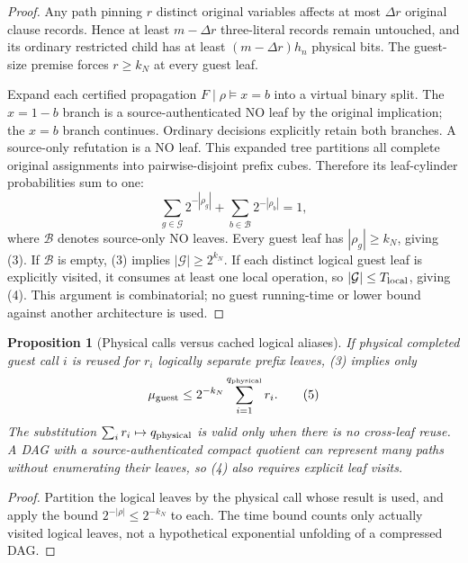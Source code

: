 \documentclass[11pt]{article}
\newtheorem{proposition}{Proposition}
\begin{document}
\begin{proof}
Any path pinning $r$ distinct original variables affects at most
$\Delta r$ original clause records. Hence at least $m-\Delta r$
three-literal records remain untouched, and its ordinary restricted child
has at least $(m-\Delta r)h_n$ physical bits. The guest-size premise forces
$r\ge k_N$ at every guest leaf.

Expand each certified propagation $F\mid\rho\models x=b$ into a virtual
binary split. The $x=1-b$ branch is a source-authenticated NO leaf by the
original implication; the $x=b$ branch continues. Ordinary decisions
explicitly retain both branches. A source-only refutation is a NO leaf.
This expanded tree partitions all complete original assignments into
pairwise-disjoint prefix cubes. Therefore its leaf-cylinder probabilities
sum to one:
\[
 \sum_{g\in\mathcal G}2^{-|\rho_g|}
 +\sum_{b\in\mathcal B}2^{-|\rho_b|}=1,
\]
where $\mathcal B$ denotes source-only NO leaves. Every guest leaf has
$|\rho_g|\ge k_N$, giving (3). If $\mathcal B$ is empty, (3) implies
$|\mathcal G|\ge2^{k_N}$. If each distinct logical guest leaf is explicitly
visited, it consumes at least one local operation, so
$|\mathcal G|\le T_{\rm local}$, giving (4). This argument is combinatorial;
no guest running-time or lower bound against another architecture is used.
\end{proof}

\begin{proposition}[Physical calls versus cached logical aliases]
If physical completed guest call $i$ is reused for $r_i$ logically separate
prefix leaves, (3) implies only
\[
 \mu_{\rm guest}\le2^{-k_N}\sum_{i=1}^{q_{\rm physical}}r_i.
                                                                    \tag{5}
\]
The substitution $\sum_i r_i\mapsto q_{\rm physical}$ is valid only
when there is no cross-leaf reuse. A DAG with a source-authenticated compact
quotient can represent many paths without enumerating their leaves, so
(4) also requires \emph{explicit} leaf visits.
\end{proposition}
\begin{proof}Partition the logical leaves by the physical call whose
result is used, and apply the bound $2^{-|\rho|}\le2^{-k_N}$ to each.
The time bound counts only actually visited logical leaves, not a
hypothetical exponential unfolding of a compressed DAG.
\end{proof}
\end{document}
